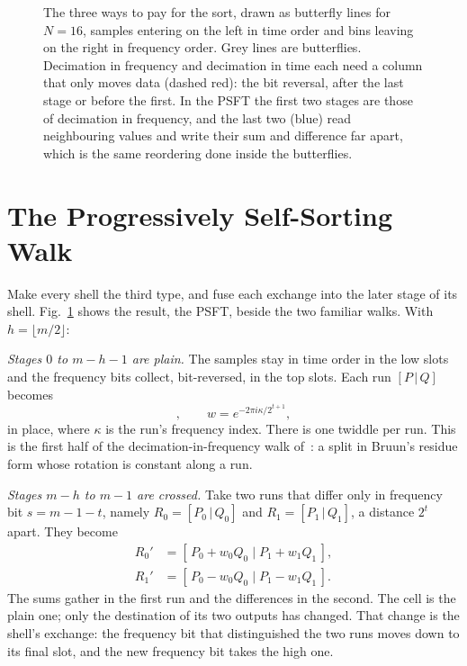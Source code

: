 \documentclass[conference]{IEEEtran}
\begin{document}
\begin{figure}[t]
\centering

\caption{The three ways to pay for the sort, drawn as butterfly lines for $N=16$, samples entering on the left in time order and bins leaving on the right in frequency order. Grey lines are butterflies. Decimation in frequency and decimation in time each need a column that only moves data (dashed red): the bit reversal, after the last stage or before the first. In the PSFT the first two stages are those of decimation in frequency, and the last two (blue) read neighbouring values and write their sum and difference far apart, which is the same reordering done inside the butterflies.}
\label{fig:flows}
\end{figure}

\section{The Progressively Self-Sorting Walk}\label{sec:walk}

Make every shell the third type, and fuse each exchange into the later stage of its shell.
Fig.~\ref{fig:flows} shows the result, the PSFT, beside the two familiar walks.
With $h=\lfloor m/2\rfloor$:

\emph{Stages $0$ to $m{-}h{-}1$ are plain.}
The samples stay in time order in the low slots and the frequency bits collect, bit-reversed, in the top slots.
Each run $[P\,|\,Q]$ becomes
\begin{equation}
[\,P+wQ \;|\; P-wQ\,],\qquad w=e^{-2\pi i\kappa/2^{t+1}},
\end{equation}
in place, where $\kappa$ is the run's frequency index.
There is one twiddle per run.
This is the first half of the decimation-in-frequency walk of~\cite{obr}: a split in Bruun's residue form whose rotation is constant along a run.

\emph{Stages $m{-}h$ to $m{-}1$ are crossed.}
Take two runs that differ only in frequency bit $s=m{-}1{-}t$, namely $R_0=[P_0\,|\,Q_0]$ and $R_1=[P_1\,|\,Q_1]$, a distance $2^t$ apart.
They become
\begin{equation}
\begin{aligned}
R_0' &= [\,P_0+w_0Q_0 \;|\; P_1+w_1Q_1\,],\\
R_1' &= [\,P_0-w_0Q_0 \;|\; P_1-w_1Q_1\,].
\end{aligned}
\end{equation}
The sums gather in the first run and the differences in the second.
The cell is the plain one; only the destination of its two outputs has changed.
That change is the shell's exchange: the frequency bit that distinguished the two runs moves down to its final slot, and the new frequency bit takes the high one.
\end{document}

